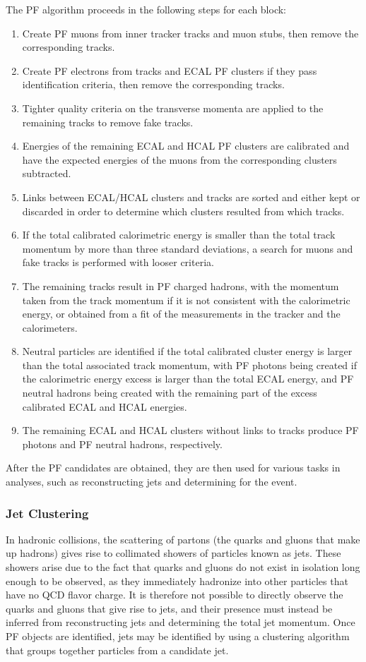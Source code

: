 The PF algorithm proceeds in the following steps for each block:
\begin{enumerate}
  \item Create PF muons from inner tracker tracks and muon stubs, then remove the corresponding tracks.
  \item Create PF electrons from tracks and ECAL PF clusters if they pass identification criteria, then remove the corresponding tracks.
  \item Tighter quality criteria on the transverse momenta are applied to the remaining tracks to remove fake tracks.
  \item Energies of the remaining ECAL and HCAL PF clusters are calibrated and have the expected energies of the muons from the corresponding clusters subtracted.
  \item Links between ECAL/HCAL clusters and tracks are sorted and either kept or discarded in order to determine which clusters resulted from which tracks.
  \item If the total calibrated calorimetric energy is smaller than the total track momentum by more than three standard deviations, a search for muons and fake tracks is performed with looser criteria.
  \item The remaining tracks result in PF charged hadrons, with the momentum taken from the track momentum if it is not consistent with the calorimetric energy, or obtained from a fit of the measurements in the tracker and the calorimeters.
  \item Neutral particles are identified if the total calibrated cluster energy is larger than the total associated track momentum, with PF photons being created if the calorimetric energy excess is larger than the total ECAL energy, and PF neutral hadrons being created with the remaining part of the excess calibrated ECAL and HCAL energies.
  \item The remaining ECAL and HCAL clusters without links to tracks produce PF photons and PF neutral hadrons, respectively.
\end{enumerate}
After the PF candidates are obtained, they are then used for various tasks in analyses, such as reconstructing jets and determining \ptmiss for the event.

\subsubsection{Jet Clustering}

In hadronic collisions, the scattering of partons (the quarks and gluons that make up hadrons) gives rise to collimated showers of particles known as jets.
These showers arise due to the fact that quarks and gluons do not exist in isolation long enough to be observed, as they immediately hadronize into other particles that have no QCD flavor charge. %
It is therefore not possible to directly observe the quarks and gluons that give rise to jets, and their presence must instead be inferred from reconstructing jets and determining the total jet momentum.
Once PF objects are identified, jets may be identified by using a clustering algorithm that groups together particles from a candidate jet.

